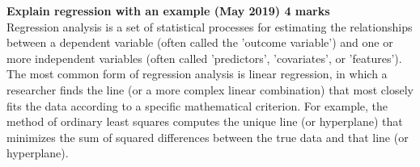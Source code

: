 
\textbf{\textcolor{LightMagenta}{Explain regression with an example (May 2019) \hfill 4 marks}} \\[5pt]
Regression analysis is a set of statistical processes for estimating the relationships between a dependent variable (often called the 'outcome variable') and one or more independent variables (often called 'predictors', 'covariates', or 'features'). The most common form of regression analysis is linear regression, in which a researcher finds the line (or a more complex linear combination) that most closely fits the data according to a specific mathematical criterion. For example, the method of ordinary least squares computes the unique line (or hyperplane) that minimizes the sum of squared differences between the true data and that line (or hyperplane).


\\